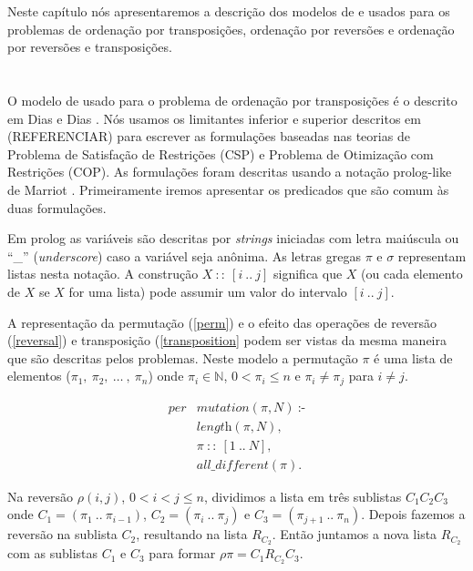 Neste capítulo nós apresentaremos a descrição dos modelos de \pr{} e
\pli{} usados para os problemas de ordenação por transposições,
ordenação por reversões e ordenação por reversões e transposições.

\section{\PR}
\label{subsec:cp}
O modelo de \pr{} usado para o problema de ordenação por transposições
é o descrito em Dias e Dias \cite{DiasDias*2009}. Nós usamos os
limitantes inferior e superior descritos em (REFERENCIAR) para
escrever as formulações baseadas nas teorias de Problema de Satisfação
de Restrições (CSP) e Problema de Otimização com Restrições (COP). As
formulações foram descritas usando a notação prolog-like de
Marriot \cite{Marriott*1998}. Primeiramente iremos apresentar os
predicados que são comum às duas formulações.

Em prolog as variáveis são descritas por \textit{strings} iniciadas
com letra maiúscula ou ``\_'' (\textit{underscore}) caso a variável
seja anônima. As letras gregas $\pi$ e $\sigma$ representam listas
nesta notação. A construção $X~::~[i~..~j]$ significa que $X$ (ou cada
elemento de $X$ se $X$ for uma lista) pode assumir um valor do
intervalo $[i~..~j]$.

A representação da permutação (\ref{perm}) e o efeito das operações de
reversão (\ref{reversal}) e transposição (\ref{transposition} podem
ser vistas da mesma maneira que são descritas pelos problemas. Neste
modelo a permutação $\pi$ é uma lista de elementos
($\pi_{1},~\pi_{2},~\ldots~,~\pi_{n}$) onde $\pi_{i} \in \mathbb{N}$, $0
< \pi_{i} \le n$ e $\pi_{i} \neq \pi_{j}$ para $i \neq j$.

\begin{align}
  \label{perm}
  \textit{per}&\textit{mutation}(\pi, N)~\text{:-} \nonumber\\
  &\textit{length}(\pi, N), \\ 
  &\pi~::~[1~..~N], \nonumber\\
  &\textit{all\_different}(\pi). \nonumber
\end{align}

Na reversão $\rho(i,j)$, $0 < i < j \leq n$, dividimos a lista em
três sublistas $C_{1}C_{2}C_{3}$ onde $C_{1} =
(\pi_{1}~..~\pi_{i-1})$, $C_{2} = (\pi_{i}~..~\pi_{j})$ e $C_{3} =
(\pi_{j+1}~..~\pi_{n})$. Depois fazemos a reversão na sublista
$C_{2}$, resultando na lista $R_{C_{2}}$. Então juntamos a nova lista
$R_{C_{2}}$ com as sublistas $C_{1}$ e $C_{3}$ para formar $\rho\pi =
C_{1}R_{C_{2}}C_{3}$.

